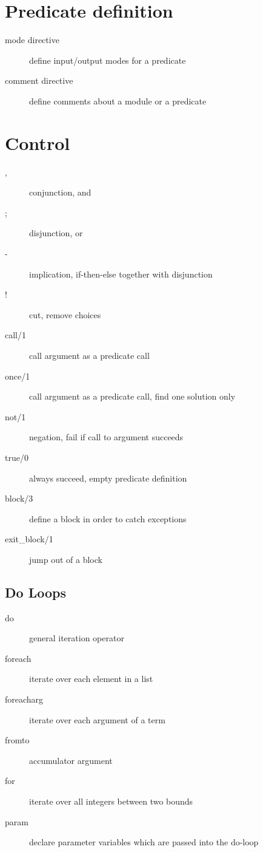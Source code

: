 \documentclass[a4paper,12pt]{report}
\begin{document}
\section{Predicate definition}
\begin{description}
\item[mode directive] define input/output modes for a predicate
\item[comment directive] define comments about a module or a predicate
\end{description}

\section{Control}
\begin{description}
\item[,] conjunction, and
\item[;] disjunction, or
\item[-\gt] implication, if-then-else together with disjunction
\item[!] cut, remove choices
\item[call/1] call argument as a predicate call
\item[once/1] call argument as a predicate call, find one solution only
\item[not/1] negation, fail if call to argument succeeds
\item[true/0] always succeed, empty predicate definition
\item[block/3] define a block in order to catch exceptions
\item[exit\_block/1] jump out of a block
\end{description}

\subsection{Do Loops}
\begin{description}
\item[do] general iteration operator
\item[foreach] iterate over each element in a list
\item[foreacharg] iterate over each argument of a term
\item[fromto] accumulator argument
\item[for] iterate over all integers between two bounds
\item[param] declare parameter variables which are passed into the do-loop
\end{description}
\end{document}
